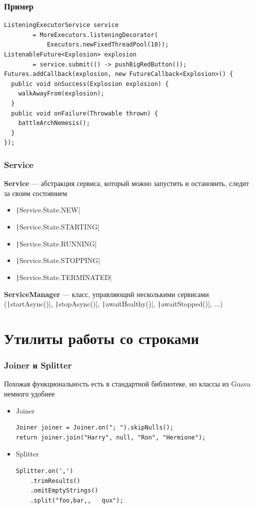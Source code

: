 \documentclass[xetex,mathserif,serif]{beamer}
\begin{document}
	\begin{frame}[fragile]
		\frametitle{Пример}
		\begin{verbatim}
ListeningExecutorService service 
        = MoreExecutors.listeningDecorator(
            Executors.newFixedThreadPool(10));
ListenableFuture<Explosion> explosion 
        = service.submit(() -> pushBigRedButton());
Futures.addCallback(explosion, new FutureCallback<Explosion>() {
  public void onSuccess(Explosion explosion) {
    walkAwayFrom(explosion);
  }
  public void onFailure(Throwable thrown) {
    battleArchNemesis();
  }
});
		\end{verbatim}
\end{frame}

	\begin{frame}
		\frametitle{Service}
		\textbf{Service} --- абстракция сервиса, который можно запустить и остановить, следит за своим состоянием
		\begin{itemize}
			\item \texttt|Service.State.NEW|
			\item \texttt|Service.State.STARTING|
			\item \texttt|Service.State.RUNNING|
			\item \texttt|Service.State.STOPPING|
			\item \texttt|Service.State.TERMINATED|
		\end{itemize}

		\textbf{ServiceManager} --- класс, управляющий несколькими сервисами (\texttt|startAsync()|, \texttt|stopAsync()|, \texttt|awaitHealthy()|, \texttt|awaitStopped()|, ...)
	\end{frame}

	\section{Утилиты работы со строками}

	\begin{frame}[fragile]
		\frametitle{Joiner и Splitter}
		Похожая функциональность есть в стандартной библиотеке, но классы из Guava немного удобнее
		\begin{itemize}
			\item Joiner
			
			\begin{verbatim}
Joiner joiner = Joiner.on("; ").skipNulls();
return joiner.join("Harry", null, "Ron", "Hermione");
			\end{verbatim}
			\item Splitter

			\begin{verbatim}
Splitter.on(',')
    .trimResults()
    .omitEmptyStrings()
    .split("foo,bar,,   qux");
			\end{verbatim}
		\end{itemize}
\end{frame}
	
\end{document}
